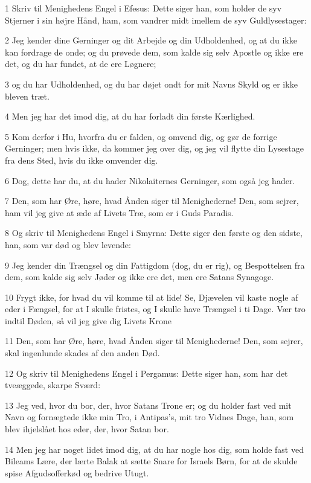 \par 1 Skriv til Menighedens Engel i Efesus: Dette siger han, som holder de syv Stjerner i sin højre Hånd, ham, som vandrer midt imellem de syv Guldlysestager:
\par 2 Jeg kender dine Gerninger og dit Arbejde og din Udholdenhed, og at du ikke kan fordrage de onde; og du prøvede dem, som kalde sig selv Apostle og ikke ere det, og du har fundet, at de ere Løgnere;
\par 3 og du har Udholdenhed, og du har døjet ondt for mit Navns Skyld og er ikke bleven træt.
\par 4 Men jeg har det imod dig, at du har forladt din første Kærlighed.
\par 5 Kom derfor i Hu, hvorfra du er falden, og omvend dig, og gør de forrige Gerninger; men hvis ikke, da kommer jeg over dig, og jeg vil flytte din Lysestage fra dens Sted, hvis du ikke omvender dig.
\par 6 Dog, dette har du, at du hader Nikolaiternes Gerninger, som også jeg hader.
\par 7 Den, som har Øre, høre, hvad Ånden siger til Menighederne! Den, som sejrer, ham vil jeg give at æde af Livets Træ, som er i Guds Paradis.
\par 8 Og skriv til Menighedens Engel i Smyrna: Dette siger den første og den sidste, han, som var død og blev levende:
\par 9 Jeg kender din Trængsel og din Fattigdom (dog, du er rig), og Bespottelsen fra dem, som kalde sig selv Jøder og ikke ere det, men ere Satans Synagoge.
\par 10 Frygt ikke, for hvad du vil komme til at lide! Se, Djævelen vil kaste nogle af eder i Fængsel, for at I skulle fristes, og I skulle have Trængsel i ti Dage. Vær tro indtil Døden, så vil jeg give dig Livets Krone
\par 11 Den, som har Øre, høre, hvad Ånden siger til Menighederne! Den, som sejrer, skal ingenlunde skades af den anden Død.
\par 12 Og skriv til Menighedens Engel i Pergamus: Dette siger han, som har det tveæggede, skarpe Sværd:
\par 13 Jeg ved, hvor du bor, der, hvor Satans Trone er; og du holder fast ved mit Navn og fornægtede ikke min Tro, i Antipas's, mit tro Vidnes Dage, han, som blev ihjelslået hos eder, der, hvor Satan bor.
\par 14 Men jeg har noget lidet imod dig, at du har nogle hos dig, som holde fast ved Bileams Lære, der lærte Balak at sætte Snare for Israels Børn, for at de skulde spise Afgudsofferkød og bedrive Utugt.
